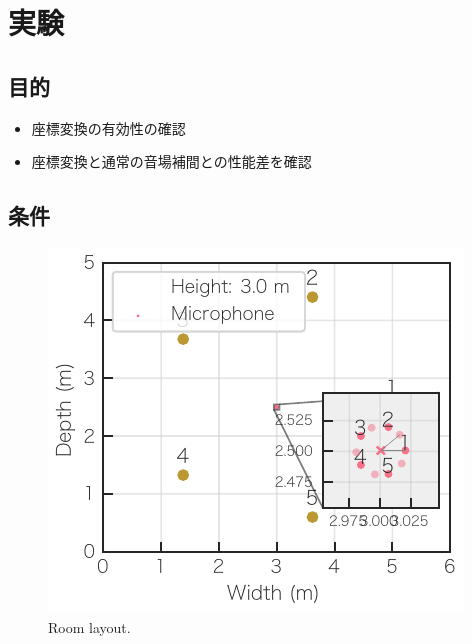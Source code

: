 \documentclass[sip,biber]{now-journal}
\begin{document}
\section{実験}
\subsection*{目的}
\begin{itemize}
  \item 座標変換の有効性の確認
  \item 座標変換と通常の音場補間との性能差を確認
\end{itemize}

\subsection*{条件}
\begin{figure}[t]
  \centering
  \includegraphics{figures/room_layout.pdf}
  \caption{Room layout.}%
  \label{fig:layout}
\end{figure}
\end{document}
